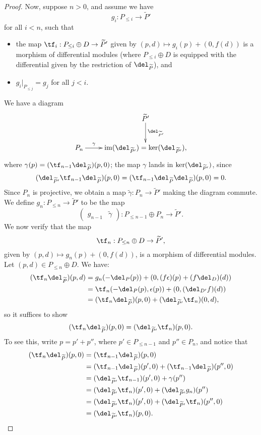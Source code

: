 \documentclass[12pt]{amsart}
\theoremstyle{definition}
\theoremstyle{remark}
\newcommand{\im}{\operatorname{im}}
\def\tP{\widetilde{P}}
\begin{document}
\begin{proof}
Now, suppose $n > 0$, and assume we have 
$$
g_{i} : P_{\le i}  \to \tP'
$$
for all $i < n$, such that 
\begin{itemize}
\item the map $\tf_{i} : P_{\le i} \oplus D \to \tP'$ given by $(p, d) \mapsto g_{i}(p) + (0, f(d))$ is a morphism of differential modules (where $P_{\le i} \oplus D$ is equipped with the differential given by the restriction of $\del_{\tP}$), and
\item $g_{i}|_{P_{\le j}} = g_{j }$ for all $j < i$.
\end{itemize}
We have a diagram
$$
\xymatrix{
& \tP' \ar[d]^-{\del_{\tP'}} \\
P_{n} \ar[r]^-{\gamma} & \im(\del_{\tP'}) = \ker(\del_{\tP'}),
}
$$
where $\gamma(p) = (\tf_{n-1}  \del_{\tP})(p, 0)$; the map $\gamma$ lands in $\ker(\del_{\tP'})$, since 
$$
(\del_{\tP'}  \tf_{n-1}  \del_{\tP})(p,0) = (\tf_{n-1}   \del_{\tP}  \del_{\tP})(p, 0) = 0. 
$$
Since $P_{n}$ is projective, we obtain a map $\widetilde{\gamma} : P_{n} \to \tP'$ making the diagram commute. We define $g_{n} : P_{\le n} \to \tP'$ to be the map
$$
\begin{pmatrix} g_{n-1} & \widetilde{\gamma} \end{pmatrix} : P_{\le n-1} \oplus P_n \to \tP'.
$$
We now verify that the map 
$$
\tf_{n} : P_{\le n} \oplus D \to \tP',
$$
given by $(p, d) \mapsto g_{n}(p) + (0, f(d))$, is a morphism of differential modules. Let $(p, d) \in P_{\le n} \oplus D$. We have:
\begin{align*}
(\tf_{n}  \del_{\tP})(p, d) &= g_{n}(-\del_P(p)) + (0, (f  \epsilon)(p) + (f  \del_D)(d)) \\
& = \tf_{n}( -\del_P(p), \epsilon(p)) + (0, (\del_{D'} f)(d)) \\
&= (\tf_{n}  \del_{\tP})(p, 0) + (\del_{\tP'} \tf_n)(0,d),
\end{align*}
so it suffices to show
$$
(\tf_{n}  \del_{\tP})(p, 0)  = (\del_{\tP'}  \tf_{n})(p, 0).
$$
To see this, write $p = p' + p''$, where $p' \in P_{\le n -1}$ and $p'' \in P_n$, and notice that
\begin{align*}
(\tf_{n}  \del_{\tP})(p, 0) &= (\tf_{n-1}  \del_{\tP})(p, 0) \\
&= (\tf_{n-1}  \del_{\tP})(p', 0) + (\tf_{n-1}  \del_{\tP})(p'', 0) \\
&= ( \del_{\tP'}\tf_{n-1})(p', 0) + \gamma(p'') \\
&= (\del_{\tP'} \tf_{n} )(p', 0) + (\del_{\tP'} g_n)(p'') \\
&= (\del_{\tP'} \tf_{n} )(p', 0) + (\del_{\tP'} \tf_{n})(p'',0) \\
&= (\del_{\tP'} \tf_{n})(p, 0). \\
\end{align*}


\end{proof}
\end{document}
